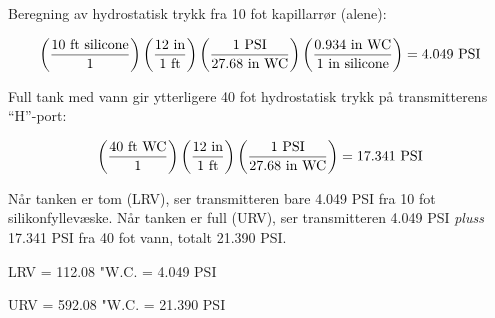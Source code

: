 











Beregning av hydrostatisk trykk fra 10 fot kapillarrør (alene):

$$\left(10 \hbox{ ft silicone} \over 1 \right) \left(12 \hbox{ in} \over 1 \hbox{ ft} \right) \left(1 \hbox{ PSI} \over 27.68 \hbox{ in WC} \right) \left(0.934 \hbox{ in WC} \over 1 \hbox{ in silicone} \right) = 4.049 \hbox{ PSI}$$

\vskip 10pt

Full tank med vann gir ytterligere 40 fot hydrostatisk trykk på transmitterens ``H''-port:

$$\left(40 \hbox{ ft WC} \over 1 \right) \left(12 \hbox{ in} \over 1 \hbox{ ft} \right) \left(1 \hbox{ PSI} \over 27.68 \hbox{ in WC} \right) = 17.341 \hbox{ PSI}$$

\vskip 10pt

Når tanken er tom (LRV), ser transmitteren bare 4.049 PSI fra 10 fot silikonfyllevæske.  Når tanken er full (URV), ser transmitteren 4.049 PSI {\it pluss} 17.341 PSI fra 40 fot vann, totalt 21.390 PSI.

\vskip 10pt

LRV = 112.08 "W.C. = 4.049 PSI

\vskip 10pt

URV = 592.08 "W.C. = 21.390 PSI


